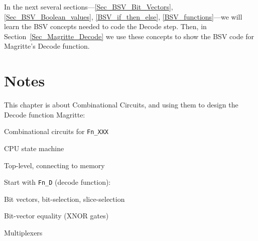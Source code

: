 In the next several sections---\ref{Sec_BSV_Bit_Vectors},
\ref{Sec_BSV_Boolean_values}, \ref{BSV_if_then_else},
\ref{BSV_functions}---we will learn the BSV concepts needed to code
the Decode step.  Then, in Section~\ref{Sec_Magritte_Decode} we use
these concepts to show the BSV code for Magritte's Decode function.


\section{Notes}

This chapter is about Combinational Circuits, and using them to design
the Decode function Magritte:

\begin{tightlist}

\item Combinational circuits for \verb|Fn_XXX|

\item CPU state machine

\item Top-level, connecting to memory

\end{tightlist}

Start with \verb|Fn_D| (decode function):
\begin{tightlist}

\item Bit vectors, bit-selection, slice-selection

\item Bit-vector equality (XNOR gates)

\item Multiplexers

\end{tightlist}


